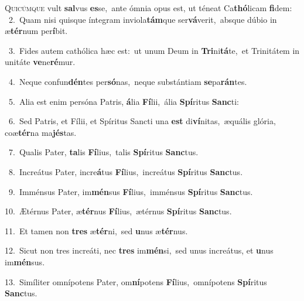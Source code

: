 \lettrine{\initial\textcolor{\initialcolor}{Q}}{uicúmque} vult \textbf{sal}\-vus \textbf{es}\-se,~\star ante ómnia opus est, ut téneat Ca\-\textbf{thó}\-licam \textbf{fi}\-dem:\\
{\numbfont\textcolor{\numbcolor}{~2.}}~Quam nisi quisque íntegram inviola\-\textbf{tám}\-que ser\-\textbf{vá}\-verit,~\star absque dúbio in æ\-\textbf{tér}\-num per\-\textbf{í}\-bit.\par
{\numbfont\textcolor{\numbcolor}{~3.}}~Fides autem cathólica hæc est:~\dagger ut unum Deum in \textbf{Tri}\-ni\-\textbf{tá}\-te,~\star et Trinitátem in unitáte \textbf{ve}\-ne\-\textbf{ré}\-mur.\par
{\numbfont\textcolor{\numbcolor}{~4.}}~Neque confun\-\textbf{dén}\-tes per\-\textbf{só}\-nas,~\star neque substántiam \textbf{se}\-pa\-\textbf{rán}\-tes.\par
{\numbfont\textcolor{\numbcolor}{~5.}}~Alia est enim persóna Patris, \textbf{á}\-lia \textbf{Fí}\-lii,~\star ália \textbf{Spí}\-ritus \textbf{Sanc}\-ti:\par
{\numbfont\textcolor{\numbcolor}{~6.}}~Sed Patris, et Fílii, et Spíritus Sancti una \textbf{est} di\-\textbf{ví}\-nitas,~\star æquális glória, coæ\-\textbf{tér}\-na ma\-\textbf{jés}\-tas.\par
{\numbfont\textcolor{\numbcolor}{~7.}}~Qualis Pater, \textbf{ta}\-lis \textbf{Fí}\-lius,~\star talis \textbf{Spí}\-ritus \textbf{Sanc}\-tus.\par
{\numbfont\textcolor{\numbcolor}{~8.}}~Increátus Pater, incre\-\textbf{á}\-tus \textbf{Fí}\-lius,~\star increátus \textbf{Spí}\-ritus \textbf{Sanc}\-tus.\par
{\numbfont\textcolor{\numbcolor}{~9.}}~Imménsus Pater, im\-\textbf{mén}\-sus \textbf{Fí}\-lius,~\star imménsus \textbf{Spí}\-ritus \textbf{Sanc}\-tus.\par
{\numbfont\textcolor{\numbcolor}{10.}}~Ætérnus Pater, æ\-\textbf{tér}\-nus \textbf{Fí}\-lius,~\star ætérnus \textbf{Spí}\-ritus \textbf{Sanc}\-tus.\par
{\numbfont\textcolor{\numbcolor}{11.}}~Et tamen non \textbf{tres} æ\-\textbf{tér}\-ni,~\star sed \textbf{u}\-nus æ\-\textbf{tér}\-nus.\par
{\numbfont\textcolor{\numbcolor}{12.}}~Sicut non tres increáti, nec \textbf{tres} im\-\textbf{mén}\-si,~\star sed unus increátus, et \textbf{u}\-nus im\-\textbf{mén}\-sus.\par
{\numbfont\textcolor{\numbcolor}{13.}}~Simíliter omnípotens Pater, om\-\textbf{ní}\-potens \textbf{Fí}\-lius,~\star omnípotens \textbf{Spí}\-ritus \textbf{Sanc}\-tus.\par
